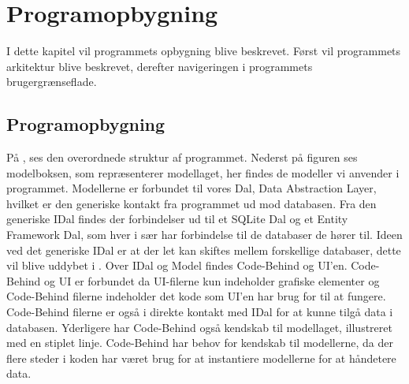 \chapter{Programopbygning}

I dette kapitel vil programmets opbygning blive beskrevet. Først vil programmets arkitektur blive beskrevet, derefter navigeringen i programmets brugergrænseflade.


\section{Programopbygning}\label{sec:programopbygning}


På , ses den overordnede struktur af programmet.
Nederst på figuren ses modelboksen, som repræsenterer modellaget, her findes de modeller vi anvender i programmet.
Modellerne er forbundet til vores Dal, Data Abstraction Layer, hvilket er den generiske kontakt fra programmet ud mod databasen.
Fra den generiske IDal findes der forbindelser ud til et SQLite Dal og et Entity Framework Dal, som hver i sær har forbindelse til de databaser de hører til.
Ideen ved det generiske IDal er at der let kan skiftes mellem forskellige databaser, dette vil blive uddybet i .
Over IDal og Model findes Code-Behind og UI'en.
Code-Behind og UI er forbundet da UI-filerne kun indeholder grafiske elementer og Code-Behind filerne indeholder det kode som UI'en har brug for til at fungere.
Code-Behind filerne er også i direkte kontakt med IDal for at kunne tilgå data i databasen.
Yderligere har Code-Behind også kendskab til modellaget, illustreret med en stiplet linje.
Code-Behind har behov for kendskab til modellerne, da der flere steder i koden har været brug for at instantiere modellerne for at håndetere data. 

